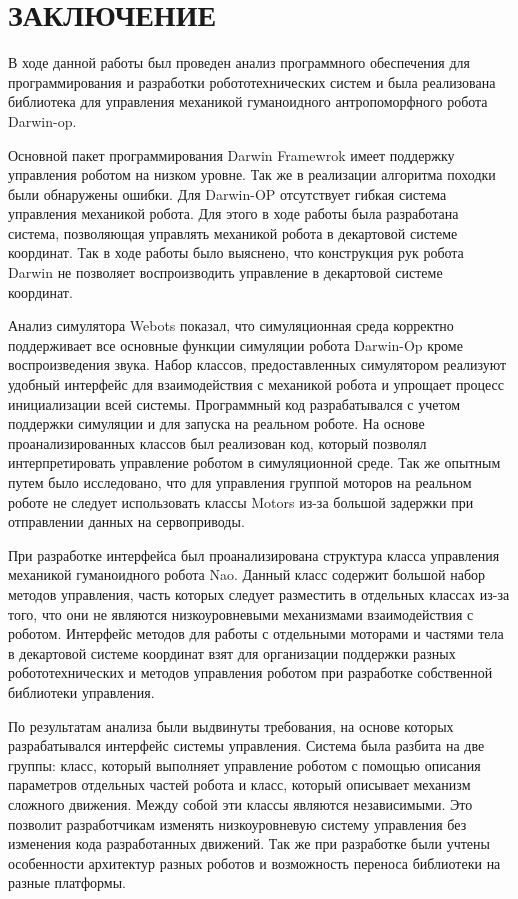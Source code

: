 \chapter*{ЗАКЛЮЧЕНИЕ}

В ходе данной работы был проведен анализ программного обеспечения для программирования и разработки робототехнических систем и была реализована библиотека для управления механикой гуманоидного антропоморфного робота Darwin-op.

Основной пакет программирования Darwin Framewrok имеет поддержку управления роботом на низком уровне. Так же в реализации алгоритма походки были обнаружены ошибки. Для Darwin-OP отсутствует гибкая система управления механикой робота. Для этого в ходе работы была разработана система, позволяющая управлять механикой робота в декартовой системе координат. Так в ходе работы было выяснено, что конструкция рук робота Darwin не позволяет воспроизводить управление в декартовой системе координат.

Анализ симулятора Webots показал, что симуляционная среда корректно поддерживает все основные функции симуляции робота Darwin-Op кроме воспроизведения звука. Набор классов, предоставленных симулятором реализуют удобный интерфейс для взаимодействия с механикой робота и упрощает процесс инициализации всей системы. Программный код разрабатывался с учетом поддержки симуляции и для запуска на реальном роботе. На основе проанализированных классов был реализован код, который позволял интерпретировать управление роботом в симуляционной среде. Так же опытным путем было исследовано, что для управления группой моторов на реальном роботе не следует использовать классы Motors из-за большой задержки при отправлении данных на сервоприводы.

При разработке интерфейса был проанализирована структура класса управления механикой гуманоидного робота Nao. Данный класс содержит большой набор методов управления, часть которых следует разместить в отдельных классах из-за того, что они не являются низкоуровневыми механизмами взаимодействия с роботом. Интерфейс методов для работы с отдельными моторами и частями тела в декартовой системе координат взят для организации поддержки разных робототехнических и методов управления роботом при разработке собственной библиотеки управления.

По результатам анализа были выдвинуты требования, на основе которых разрабатывался интерфейс системы управления. Система была разбита на две группы: класс, который выполняет управление роботом с помощью описания параметров отдельных частей робота и класс, который описывает механизм сложного движения. Между собой эти классы являются независимыми. Это позволит разработчикам изменять низкоуровневую систему управления без изменения кода разработанных движений. Так же при разработке были учтены особенности архитектур разных роботов и возможность переноса библиотеки на разные платформы. 

